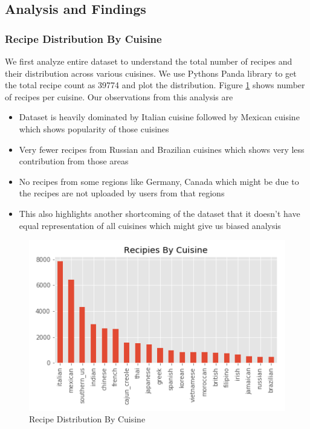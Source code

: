 \documentclass[sigconf]{acmart}
\begin{document}
\subsection{Analysis and Findings}

\subsubsection{Recipe Distribution By Cuisine}
We first analyze entire dataset to understand the total number of recipes and their distribution across various cuisines. We use Pythons Panda library to get the total recipe count as 39774 and plot the distribution. Figure \ref{f:Number_of_recipes_by_cuisine} shows number of recipes per cuisine. Our observations from this analysis are
\begin{itemize}
\item Dataset is heavily dominated by Italian cuisine followed by Mexican cuisine which shows popularity of those cuisines
\item Very fewer recipes from Russian and Brazilian cuisines which shows very less contribution from those areas
\item No recipes from some regions like Germany, Canada which might be due to the recipes are not uploaded by users from that regions 
\item This also highlights another shortcoming of the dataset that it doesn't have equal representation of all cuisines which might give us biased analysis 
\end{itemize}
 
\begin{figure}[!ht]
  \centering\includegraphics[width=\columnwidth]{images/Number_of_recipes_by_cuisine.png}
  \caption{Recipe Distribution By Cuisine }\label{f:Number_of_recipes_by_cuisine}
\end{figure}
\end{document}
